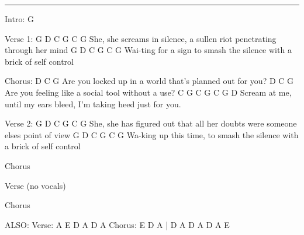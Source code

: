 \noindent\rule{\columnwidth}{1pt}

\begin{lstsong}
Intro: G

Verse 1:
G                   D                 C                            G    C G
She, she screams in silence, a sullen riot penetrating through her mind
G                D                  C                             G    C G
Wai-ting  for  a sign to smash the silence with a brick of self control

Chorus:
D                                   C               G
Are you locked up in a world that's planned out for you?
D                             C              G
Are you feeling like a social tool without a use?
C         G         C       G          C      G             D
Scream at me, until my ears bleed, I'm taking heed just for you.

Verse 2:
G                    D                C                                  G   C G
She, she has figured out that all her doubts were someone elses point of view
G               D                  C                              G     C G
Wa-king up this time, to smash the silence with a brick of self control

Chorus

Verse (no vocals)

Chorus

ALSO: 
Verse: A E D A D A
Chorus: E D A | D A D A D A E
\end{lstsong}
\newpage

